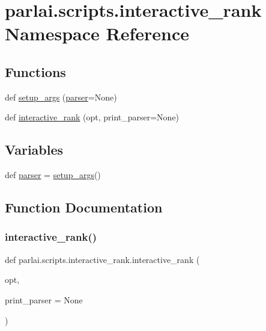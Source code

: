 \hypertarget{namespaceparlai_1_1scripts_1_1interactive__rank}{}\section{parlai.\+scripts.\+interactive\+\_\+rank Namespace Reference}
\label{namespaceparlai_1_1scripts_1_1interactive__rank}
\subsection*{Functions}
\begin{DoxyCompactItemize}
\item 
def \hyperlink{namespaceparlai_1_1scripts_1_1interactive__rank_af87c6b5d3f8843e51461c9cfd75fd510}{setup\+\_\+args} (\hyperlink{namespaceparlai_1_1scripts_1_1interactive__rank_a68288547427936a867a1b8eb9a945be7}{parser}=None)
\item 
def \hyperlink{namespaceparlai_1_1scripts_1_1interactive__rank_a9997f1d0eba4a72a45a773ec05874af3}{interactive\+\_\+rank} (opt, print\+\_\+parser=None)
\end{DoxyCompactItemize}
\subsection*{Variables}
\begin{DoxyCompactItemize}
\item 
def \hyperlink{namespaceparlai_1_1scripts_1_1interactive__rank_a68288547427936a867a1b8eb9a945be7}{parser} = \hyperlink{namespaceparlai_1_1scripts_1_1interactive__rank_af87c6b5d3f8843e51461c9cfd75fd510}{setup\+\_\+args}()
\end{DoxyCompactItemize}


\subsection{Function Documentation}
\mbox{\label{namespaceparlai_1_1scripts_1_1interactive__rank_a9997f1d0eba4a72a45a773ec05874af3}} 
\subsubsection{\texorpdfstring{interactive\+\_\+rank()}{interactive\_rank()}}
{\footnotesize\ttfamily def parlai.\+scripts.\+interactive\+\_\+rank.\+interactive\+\_\+rank (\begin{DoxyParamCaption}\item[{}]{opt,  }\item[{}]{print\+\_\+parser = {\ttfamily None} }\end{DoxyParamCaption})}

